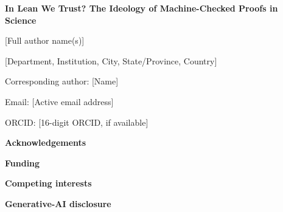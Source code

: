 \documentclass[12pt]{article}
\begin{document}
\begin{center}
{\Large\bfseries In Lean We Trust? The Ideology of Machine-Checked Proofs in Science\par}
\vspace{2em}
{\large [Full author name(s)]\par}
\vspace{1em}
[Department, Institution, City, State/Province, Country]\par
\vspace{1em}
Corresponding author: [Name]\par
Email: [Active email address]\par
ORCID: [16-digit ORCID, if available]\par
\end{center}

\vspace{2em}
\noindent\textbf{Acknowledgements}\par
[Insert acknowledgements, or state that there are none. Identifying acknowledgements must remain on this separate title page.]\par

\vspace{1em}
\noindent\textbf{Funding}\par
[Confirm funding. If none: No external funding was received for this work.]\par

\vspace{1em}
\noindent\textbf{Competing interests}\par
[Confirm competing interests. If none: The author declares no competing interests.]\par

\vspace{1em}
\noindent\textbf{Generative-AI disclosure}\par
[Insert the author-confirmed generative-AI disclosure; use the same wording as in the anonymous manuscript.]\par
\end{document}
